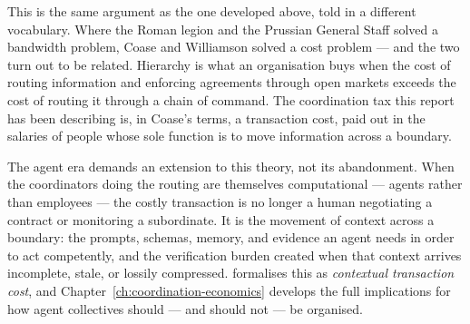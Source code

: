 This is the same argument as the one developed above, told in a different vocabulary. Where the Roman legion and the Prussian General Staff solved a bandwidth problem, Coase and Williamson solved a cost problem --- and the two turn out to be related. Hierarchy is what an organisation buys when the cost of routing information and enforcing agreements through open markets exceeds the cost of routing it through a chain of command. The coordination tax this report has been describing is, in Coase's terms, a transaction cost, paid out in the salaries of people whose sole function is to move information across a boundary.

The agent era demands an extension to this theory, not its abandonment. When the coordinators doing the routing are themselves computational --- agents rather than employees --- the costly transaction is no longer a human negotiating a contract or monitoring a subordinate. It is the movement of context across a boundary: the prompts, schemas, memory, and evidence an agent needs in order to act competently, and the verification burden created when that context arrives incomplete, stale, or lossily compressed. \textcite{Liu2026} formalises this as \emph{contextual transaction cost}, and Chapter~\ref{ch:coordination-economics} develops the full implications for how agent collectives should --- and should not --- be organised.
